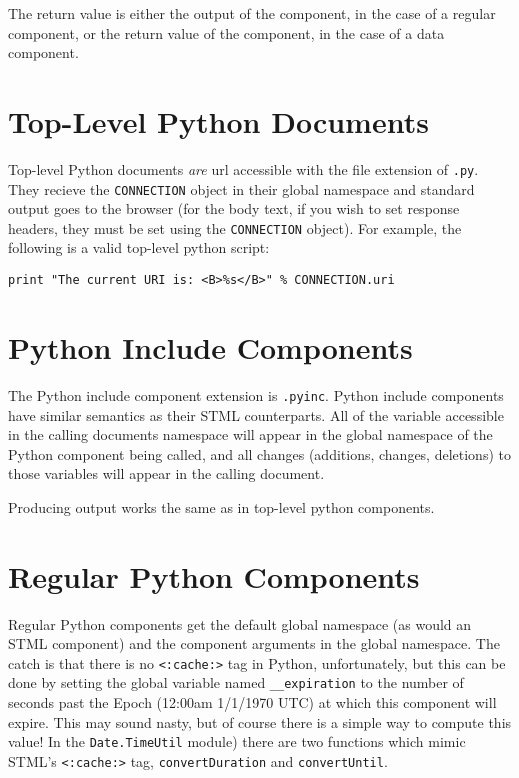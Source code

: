 \documentclass{manual}
\begin{document}
The return value is either the output of the component, in the case of
a regular component, or the return value of the component, in the case
of a data component.





\section{Top-Level Python Documents}
\label{pythontl}
Top-level Python documents \emph{are} url accessible with the file
extension of \texttt{.py}.  They recieve
the \texttt{CONNECTION} object in their global
namespace and standard output goes to the browser (for the body text, if
you wish to set response headers, they must be set using the
\texttt{CONNECTION} object).  For example, the following is a valid
top-level python script: 

\begin{verbatim}
print "The current URI is: <B>%s</B>" % CONNECTION.uri
\end{verbatim}




\section{Python Include Components}
\label{pythonincl}
The Python include component extension is \texttt{.pyinc}.
Python include components have similar semantics as their STML
counterparts.  All of the variable accessible in the calling documents
namespace will appear in the global namespace of the Python component
being called, and all changes (additions, changes, deletions) to those
variables will appear in the calling document.  

Producing output works the same as in top-level python components.




\section{Regular Python Components}
\label{pythonreg}
Regular Python components get the default global namespace (as would
an STML component) and the component arguments in the global
namespace.  The catch is that there is no \texttt{<:cache:>} tag
in Python,  unfortunately, but this can be done by setting the global variable
named \texttt{__expiration} to the number of seconds past the Epoch
(12:00am 1/1/1970 UTC) at which this component will expire.  This may sound
nasty, but of course there is a simple way to compute this value!  In
the \texttt{Date.TimeUtil} module) there are two functions which mimic STML's
\texttt{<:cache:>} tag, \texttt{convertDuration} and
\texttt{convertUntil}. 
\end{document}
